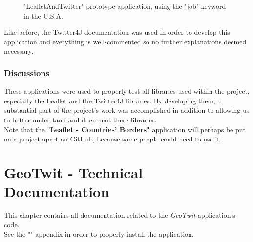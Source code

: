 \documentclass[a4paper,11pt]{report}
\begin{document}
\begin{enumerate}
\begin{figure}[H]
\begin{center}
	\vspace{-5pt}
	\caption{"LeafletAndTwitter" prototype application, using the "job" keyword in the U.S.A.}
	\end{center}
	\end{figure}
	\vspace{-20pt}
\end{enumerate}

Like before, the Twitter4J documentation was used in order to develop this application and everything is well-commented so no further explanations deemed necessary.
\bigskip

\subsection{Discussions}
These applications were used to properly test all libraries used within the project, especially the Leaflet and the Twitter4J libraries. By developing them, a substantial part of the project's work was accomplished in addition to allowing us to better understand and document these libraries.\\

Note that the \textbf{"Leaflet - Countries' Borders"} application will perhaps be put on a project apart on GitHub, because some people could need to use it.

\chapter{GeoTwit - Technical Documentation}
\label{geotwitApplication}
This chapter contains all documentation related to the \emph{GeoTwit} application's code.\\
See the "\textsl{}" appendix in order to properly install the application.
\end{document}
